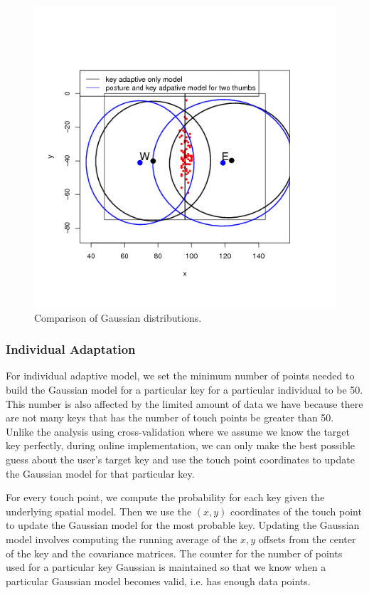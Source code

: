 \documentclass{sigchi}
\begin{document}
\begin{figure}[tb]
  \centering
  \includegraphics[width=1\columnwidth]{figures/key-posture-ellipse.png}
  \caption{Comparison of Gaussian distributions.}
  \label{fig:e-w-ellipses}
\end{figure}

\subsubsection{Individual Adaptation}
For individual adaptive model, we set the minimum number of points needed to build the
Gaussian model for a particular key for a particular individual to be 50. This number is 
also affected by the limited amount of data we have because there are not many keys that has 
the number of touch points be greater than 50. Unlike the analysis using cross-validation
where we assume we know the target key perfectly, during online implementation, we can
only make the best possible guess about the user's target key and use the touch point
coordinates to update the Gaussian model for that particular key.

For every touch point, we compute the probability for each key given the underlying spatial model.
Then we use the $(x, y)$ coordinates of the touch point to update the Gaussian model
for the most probable key. Updating the Gaussian model involves computing the running
average of the $x, y$ offsets from the center of the key and the covariance matrices. The counter 
for the number of points used for a particular key Gaussian is maintained so that we
know when a particular Gaussian model becomes valid, i.e. has enough data points.
\end{document}
